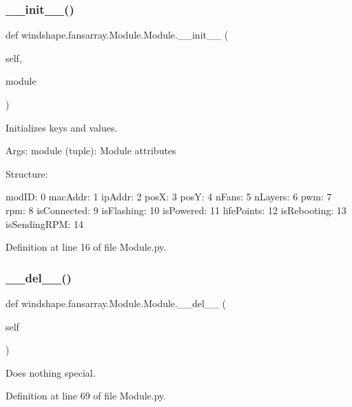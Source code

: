 \subsubsection{\texorpdfstring{\+\_\+\+\_\+init\+\_\+\+\_\+()}{\_\_init\_\_()}}
{\footnotesize\ttfamily def windshape.\+fansarray.\+Module.\+Module.\+\_\+\+\_\+init\+\_\+\+\_\+ (\begin{DoxyParamCaption}\item[{}]{self,  }\item[{}]{module }\end{DoxyParamCaption})}

\begin{DoxyVerb}Initializes keys and values.

Args:
    module (tuple): Module attributes
    
Structure:

    modID: 0
    macAddr: 1
    ipAddr: 2
    posX: 3
    posY: 4
    nFans: 5
    nLayers: 6
    pwm: 7
    rpm: 8
    isConnected: 9
    isFlashing: 10
    isPowered: 11
    lifePoints: 12
    isRebooting: 13
    isSendingRPM: 14
\end{DoxyVerb}
 

Definition at line 16 of file Module.\+py.

\mbox{\label{classwindshape_1_1fansarray_1_1_module_1_1_module_a54b00b3e420f945e1b721ec459fb048c}} 
\subsubsection{\texorpdfstring{\+\_\+\+\_\+del\+\_\+\+\_\+()}{\_\_del\_\_()}}
{\footnotesize\ttfamily def windshape.\+fansarray.\+Module.\+Module.\+\_\+\+\_\+del\+\_\+\+\_\+ (\begin{DoxyParamCaption}\item[{}]{self }\end{DoxyParamCaption})}

\begin{DoxyVerb}Does nothing special.\end{DoxyVerb}
 

Definition at line 69 of file Module.\+py.



